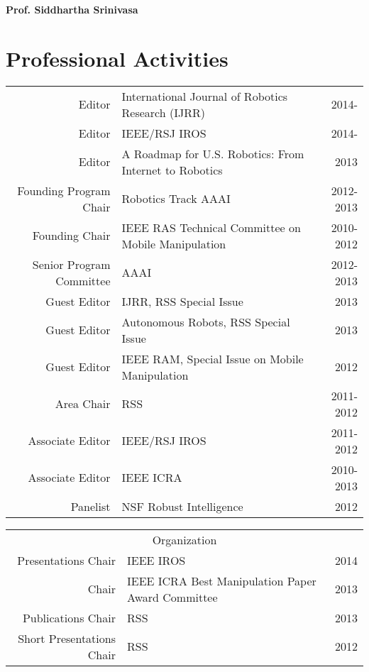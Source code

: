 \documentclass[10pt]{article}
\begin{document}
\pagestyle{empty} %

\par{\centering
		{\bf\LARGE Prof. Siddhartha Srinivasa
	}\bigskip\par}





\newpage




\section{Professional Activities}
\begin{tabularx}{\linewidth}{rXr}
Editor & International Journal of Robotics Research (IJRR) & 2014-\\
Editor & IEEE/RSJ IROS &  2014-\\
Editor & A Roadmap for U.S. Robotics: From Internet to Robotics & 2013\\
Founding Program Chair & Robotics Track AAAI & 2012-2013 \\
Founding Chair & IEEE RAS Technical Committee on Mobile Manipulation & 2010-2012\\
Senior Program Committee & AAAI & 2012-2013 \\
Guest Editor & IJRR, RSS Special Issue & 2013\\ 
Guest Editor & Autonomous Robots, RSS Special Issue & 2013\\ 
Guest Editor & IEEE RAM, Special Issue on Mobile Manipulation & 2012\\
Area Chair & RSS & 2011-2012\\
Associate Editor & IEEE/RSJ IROS & 2011-2012\\
Associate Editor & IEEE ICRA & 2010-2013\\
Panelist & NSF Robust Intelligence & 2012\\
\end{tabularx}

\begin{tabularx}{\linewidth}{rXr}
\multicolumn{3}{c}{Organization}\\
Presentations Chair & IEEE IROS & 2014\\ 
Chair & IEEE ICRA Best Manipulation Paper Award Committee & 2013\\
Publications Chair & RSS & 2013\\
Short Presentations Chair & RSS & 2012\\
\end{tabularx}
\end{document}
